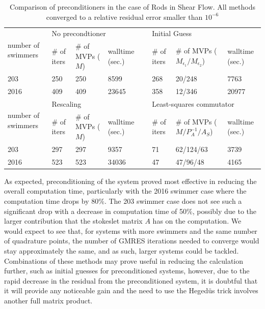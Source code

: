 \begin{table}
\begin{singlespace}
\centering
\setlength{\tabcolsep}{6pt}
\renewcommand{\arraystretch}{1.4}
\caption{Comparison of preconditioners in the case of Rods in Shear Flow. All methods converged to a relative residual error smaller than $10^{-6}$}
\small
\begin{tabular}{p{2cm} p{1cm} p{2cm} p{1.5cm} p{0.1cm} p{1cm} p{2cm} p{1.5cm}}
\multirow{2}{*}{\parbox{1.8cm}{number of swimmers}} & \multicolumn{3}{l}{No precondtioner} & & \multicolumn{3}{l}{Initial Guess} \\ \cline{2-4} \cline{6-8}
  & \# of iters & \# of MVPs ($M$) & walltime (sec.) & & \# of iters & \# of MVPs ($M_{\epsilon_1}/M_{\epsilon_2}$) & walltime (sec.) \\ \hline
  203 & 250 & 250 & 8599 & &  268 & 20/248 & 7763\\
  2016 & 409 & 409 & 23645 & & 358 & 12/346 & 20977\\ \hline
  \multirow{2}{*}{\parbox{1.8cm}{number of swimmers}} & \multicolumn{3}{l}{Rescaling} & &\multicolumn{3}{l}{Least-squares commutator} \\ \cline{2-4} \cline{6-8}
  & \# of iters & \# of MVPs ($M$) & walltime (sec.) & & \# of iters & \# of MVPs ($M/P_A^{-1}/A_S$) & walltime (sec.) \\ \hline
  203 & 297 & 297 & 9357 & & 71 & 62/124/63 & 3739 \\
  2016 & 523 & 523 & 34036 & & 47 & 47/96/48 & 4165 
\end{tabular}
\label{tab:Preconditioning}
\end{singlespace}
\end{table}

As expected, preconditioning of the system proved most effective in reducing the overall computation time, particularly with the 2016 swimmer case where the computation time drops by 80\%. The 203 swimmer case does not see such a significant drop with a decrease in computation time of 50\%, possibly due to the larger contribution that the stokeslet matrix $A$ has on the computation. We would expect to see that, for systems with more swimmers and the same number of quadrature points, the number of GMRES iterations needed to converge would stay approximately the same, and as such, larger systems could be tackled. Combinations of these methods may prove useful in reducing the calculation further, such as initial guesses for preconditioned systems, however, due to the rapid decrease in the residual from the preconditioned system, it is doubtful that it will provide any noticeable gain and the need to use the Heged{\"u}s trick involves another full matrix product.

